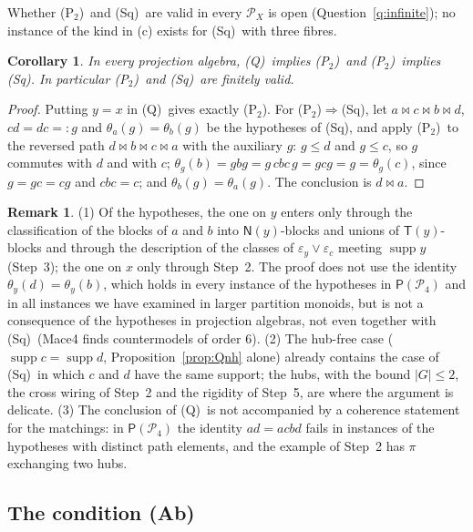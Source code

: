 \documentclass[11pt]{amsart}
\newtheorem{corollary}[theorem]{Corollary}
\theoremstyle{definition}
\newtheorem{remark}[theorem]{Remark}
\renewcommand{\P}{\mathcal{P}}      %
\newcommand{\PA}{\mathsf{P}}         %
\newcommand{\supp}{\operatorname{supp}}
\newcommand{\T}{\mathsf{T}}
\newcommand{\N}{\mathsf{N}}
\newcommand{\mt}{\bowtie}      %
\newcommand{\Wire}{\textup{(Sq)}}      %
\newcommand{\Ptwo}{\textup{(P$_2$)}}
\newcommand{\Qcond}{\textup{(Q)}}
\newcommand{\Kfour}{\textup{(Ab)}}     %
\begin{document}
Whether \Ptwo\ and \Wire\ are valid in every $\P_X$ is open (Question~\ref{q:infinite}); no instance of the kind in (c) exists for \Wire\ with three fibres.

\begin{corollary}\label{cor:QS}
In every projection algebra, \Qcond\ implies \Ptwo\ and \Ptwo\ implies \Wire. In particular \Ptwo\ and \Wire\ are finitely valid.
\end{corollary}

\begin{proof}
Putting $y=x$ in \Qcond\ gives exactly \Ptwo. For \Ptwo$\Rightarrow$\Wire, let $a\mt c\mt b\mt d$, $cd=dc=:g$ and $\theta_a(g)=\theta_b(g)$ be the hypotheses of \Wire, and apply \Ptwo\ to the reversed path $d\mt b\mt c\mt a$ with the auxiliary $g$: $g\le d$ and $g\le c$, so $g$ commutes with $d$ and with $c$; $\theta_g(b)=gbg=g\,cbc\,g=gcg=g=\theta_g(c)$, since $g=gc=cg$ and $cbc=c$; and $\theta_b(g)=\theta_a(g)$. The conclusion is $d\mt a$.
\end{proof}

\begin{remark}\label{rem:Q}
(1) Of the hypotheses, the one on $y$ enters only through the classification of the blocks of $a$ and $b$ into $\N(y)$-blocks and unions of $\T(y)$-blocks and through the description of the classes of $\varepsilon_y\vee\varepsilon_c$ meeting $\supp y$ (Step~3); the one on $x$ only through Step~2. The proof does not use the identity $\theta_y(d)=\theta_y(b)$, which holds in every instance of the hypotheses in $\PA(\P_4)$ and in all instances we have examined in larger partition monoids, but is not a consequence of the hypotheses in projection algebras, not even together with \Wire\ (Mace4 finds countermodels of order $6$). (2) The hub-free case ($\supp c=\supp d$, Proposition~\ref{prop:Qnh} alone) already contains the case of \Wire\ in which $c$ and $d$ have the same support; the hubs, with the bound $|G|\le2$, the cross wiring of Step~2 and the rigidity of Step~5, are where the argument is delicate. (3) The conclusion of \Qcond\ is not accompanied by a coherence statement for the matchings: in $\PA(\P_4)$ the identity $ad=acbd$ fails in instances of the hypotheses with distinct path elements, and the example of Step~2 has $\pi$ exchanging two hubs.
\end{remark}

\subsection{The condition \Kfour}\label{subsec:K4}
\end{document}
